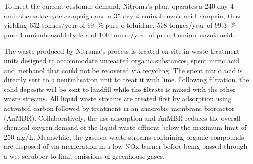 To meet the current customer demand, Nitroma's plant operates a 240-day 4-aminobenzaldehyde campaign and a 35-day 4-aminobenzoic acid campain, thus yielding 652 tonnes/year of \SI{99}{\percent} pure o-toluidine, 538 tonnes/year of \SI{99.3}{\percent} pure 4-aminobenzaldehyde and 100 tonnes/year of pure 4-aminobenzoic acid.

The waste produced by Nitroma's process is treated on-site in waste treatment units designed to accommodate unreacted organic substances, spent nitric acid and methanol that could not be recovered via recycling. The spent nitric acid is directly sent to a neutralisation unit to treat it with lime. Following filtration, the solid deposits will be sent to landfill while the filtrate is mixed with the other waste streams. All liquid waste streams are treated first by adsorption using activated carbon followed by treatment in an anaerobic membrane bioreactor (AnMBR). Collaboratively, the use adsorption and AnMBR reduces the overall chemical oxygen demand of the liquid waste effluent below the maximum limit of 250 mg/L. Meanwhile, the gaseous waste streams containing organic compounds are disposed of via incineration in a low NOx burner before being passed through a wet scrubber to limit emissions of greenhouse gases.
